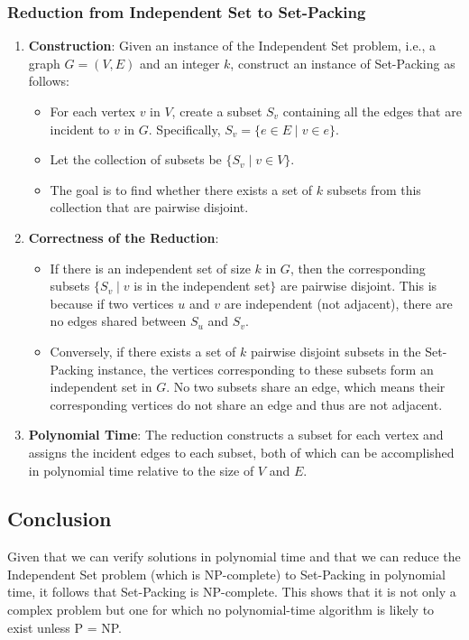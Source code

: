 \subsubsection*{Reduction from Independent Set to Set-Packing}
\begin{enumerate}
    \item \textbf{Construction}: Given an instance of the Independent Set problem, i.e., a graph \( G = (V, E) \) and an integer \( k \), construct an instance of Set-Packing as follows:
    \begin{itemize}
        \item For each vertex \( v \) in \( V \), create a subset \( S_v \) containing all the edges that are incident to \( v \) in \( G \). Specifically, \( S_v = \{e \in E \mid v \in e\}\).
        \item Let the collection of subsets be \( \{S_v \mid v \in V\} \).
        \item The goal is to find whether there exists a set of \( k \) subsets from this collection that are pairwise disjoint.
    \end{itemize}
    \item \textbf{Correctness of the Reduction}:
    \begin{itemize}
        \item If there is an independent set of size \( k \) in \( G \), then the corresponding subsets \( \{S_v \mid v \) is in the independent set\(\} \) are pairwise disjoint. This is because if two vertices \( u \) and \( v \) are independent (not adjacent), there are no edges shared between \( S_u \) and \( S_v \).
        \item Conversely, if there exists a set of \( k \) pairwise disjoint subsets in the Set-Packing instance, the vertices corresponding to these subsets form an independent set in \( G \). No two subsets share an edge, which means their corresponding vertices do not share an edge and thus are not adjacent.
    \end{itemize}
    \item \textbf{Polynomial Time}: The reduction constructs a subset for each vertex and assigns the incident edges to each subset, both of which can be accomplished in polynomial time relative to the size of \( V \) and \( E \).
\end{enumerate}

\subsection*{Conclusion}
Given that we can verify solutions in polynomial time and that we can reduce the Independent Set problem (which is NP-complete) to Set-Packing in polynomial time, it follows that Set-Packing is NP-complete. This shows that it is not only a complex problem but one for which no polynomial-time algorithm is likely to exist unless P = NP.



\newpage